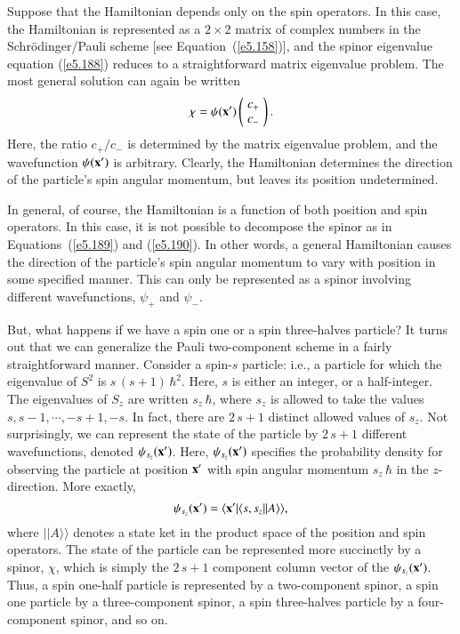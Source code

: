 Suppose that the Hamiltonian depends only on the spin operators. In this
case, the Hamiltonian is represented as a $2\times 2$ matrix of complex numbers 
in the Schr\"{o}dinger/Pauli scheme [see Equation~(\ref{e5.158})], and the spinor eigenvalue
equation (\ref{e5.188})  reduces to a straightforward matrix eigenvalue problem. 
The most general solution can again be written
\begin{equation}\label{e5.190}
\chi = \psi({\bf x}') \left(\!\begin{array}{c} c_+\\ c_-\end{array}\!\right).
\end{equation}
Here, the ratio $c_+/c_-$ is determined by the matrix eigenvalue problem,
and the wavefunction $\psi({\bf x}')$ is arbitrary. Clearly, the Hamiltonian
determines the direction of the particle's spin angular momentum, but leaves
its position undetermined. 

In general, of course, the Hamiltonian is a function of both position and
spin operators. In this case, it is not possible to decompose the 
spinor as in Equations~(\ref{e5.189})  and (\ref{e5.190}).
 In other words, a general Hamiltonian causes the
direction of the particle's spin angular momentum to vary with position in
some specified manner. This can only be represented as a spinor involving 
different wavefunctions, $\psi_+$ and $\psi_-$. 

But, what happens if we have a spin one  or a spin three-halves particle? 
It turns out that we can generalize the Pauli two-component scheme in a fairly
straightforward manner. Consider a spin-$s$ particle: {\rm i.e.}, a particle for which
the eigenvalue of $S^2$ is $s\,(s+1)\,\hbar^2$. Here, $s$ is either an integer, or a half-integer. The eigenvalues of $S_z$ are written $s_z\,\hbar$, where
$s_z$ is allowed to take the values $s, s-1, \cdots, -s+1, -s$. In fact,
there are $2\,s+1$ distinct allowed values of $s_z$. Not surprisingly, we can represent
the state of the particle by $2\,s+1$ different wavefunctions, denoted $\psi_{s_z}
({\bf x}')$. Here, $\psi_{s_z}({\bf x}')$ specifies the probability density 
for observing the particle at position ${\bf x'}$ with spin angular
momentum $s_z\,\hbar$ in the $z$-direction. More exactly,
\begin{equation}
\psi_{s_z}({\bf x}') = \langle {\bf x'}|\langle s, s_z| |A\rangle\rangle,
\end{equation}
where $||A\rangle\rangle$ denotes a state ket in the product space of the position
and spin operators. The state of the particle can be represented more
succinctly by a spinor, $\chi$, which is simply the $2\,s+1$ component column
vector  of the $\psi_{s_z}({\bf x}')$.
Thus, a spin one-half particle is represented by a two-component spinor,
a spin one particle by a three-component spinor, a spin three-halves particle
by a four-component spinor, and so on. 

